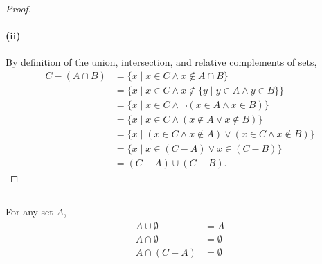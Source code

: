 \documentclass{report}
\begin{document}
\begin{proof}
  \paragraph{(ii)}%

    By definition of the union, intersection, and relative complements of sets,
      \begin{align*}
        C - (A \cap B)
          & = \{ x \mid x \in C \land x \not\in A \cap B \} \\
          & = \{ x \mid x \in C \land
                        x \not\in \{ y \mid y \in A \land y \in B \}\} \\
          & = \{ x \mid x \in C \land \neg(x \in A \land x \in B) \} \\
          & = \{ x \mid x \in C \land (x \not\in A \lor x \not\in B) \} \\
          & = \{ x \mid (x \in C \land x \not\in A) \lor
                        (x \in C \land x \not\in B) \} \\
          & = \{ x \mid x \in (C - A) \lor x \in (C - B) \} \\
          & = (C - A) \cup (C - B).
      \end{align*}

\end{proof}

\subsection{}%

For any set $A$,
  \begin{align*}
    A \cup \emptyset & = A \\
    A \cap \emptyset & = \emptyset \\
    A \cap (C - A) & = \emptyset
  \end{align*}
\end{document}
